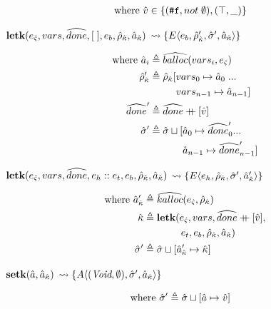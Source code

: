 \documentclass[12pt,draft]{article}
\newcommand\mdoubleplus{\ensuremath{\mathbin{+\mkern-9mu+}}}
\newcommand{\falsesyn}{\texttt{\#f}}
\newcommand{\E}[4]{E\langle #1 , #2 , #3 , #4 \rangle}
\newcommand{\A}[3]{A\langle #1 , #2 , #3 \rangle}
\begin{document}
\begin{multicols*}{2}
\begin{align*}
\text{where } \aval &\in \{(\falsesyn, not\;\emptyset) , (\top, \_)\}
\end{align*}
\begin{center}
  $\textbf{letk}(e_{\hat{\varsigma}}, vars, \widehat{done}, [\;], e_b,\hat{\rho}_{\hat{\kappa}} , \hat{a}_{\hat{\kappa}})$
  $\leadsto \{\E{e_b}{\aenv_{\akont}'}{\astore'}{\akaddr}\}$
\end{center}
\vspace{-7mm}
\begin{align*}
  \text{where }
  \abaddr_i &\triangleq \aballoc{vars_i , \ectrl} \\
  \aenv_{\akont}' &\triangleq \aenv_{\akont}[vars_0 \mapsto \abaddr_0\;... \\
            &\;\;\;\;\;\;\;\;\;\, vars_{n-1} \mapsto \abaddr_{n-1}] \\
  \adone' &\triangleq \adone \mdoubleplus [\aval] \\
  \astore' &\triangleq \astore \sqcup [\abaddr_0 \mapsto \adone'_0 ... \\
  &\;\;\;\;\;\;\;\;\;\;\;\; \abaddr_{n-1} \mapsto \adone'_{n-1}]
\end{align*}
\begin{center}
  $\textbf{letk}(e_{\hat{\varsigma}} , vars , \widehat{done} , e_h::e_t , e_b,\hat{\rho}_{\hat{\kappa}} , \hat{a}_{\hat{\kappa}})$
  $\leadsto \{\E{e_h}{\aenv_{\akont}}{\astore'}{\akaddr'}\}$
\end{center}
\vspace{-7mm}
\begin{align*}
  \text{where }
  \akaddr' &\triangleq \akalloc{\ectrl, \aenv_{\akont}} \\
  \akont &\triangleq \textbf{letk}(\ectrl, vars , \adone \mdoubleplus [\aval], \\
  &\;\;\;\;\;\;\;\;\;\;\;\;\;\, e_t , e_b , \aenv_{\akont} , \akaddr) \\
  \astore' &\triangleq \astore \sqcup [\akaddr' \mapsto \akont]
\end{align*}
\begin{center}
  $\textbf{setk}(\hat{a} , \hat{a}_{\hat{\kappa}})$
  $\leadsto \{\A{(\textit{Void} , \emptyset)}{\astore'}{\akaddr}\}$
\end{center}
\vspace{-7mm}
\begin{align*}
  \text{where }
  \hat{\sigma}' &\triangleq \hat{\sigma} \sqcup [ \hat{a} \mapsto \hat{v} ]
\end{align*}


\end{multicols*}
\end{document}
